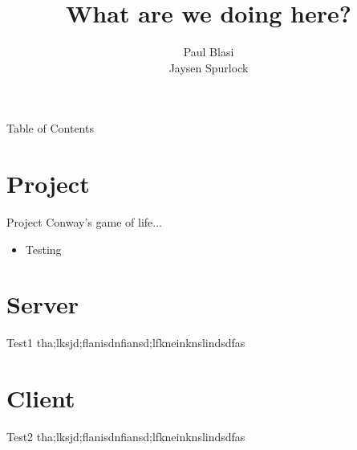 \documentclass[11pt]{beamer}
\author[]{Paul Blasi \\ Jaysen Spurlock}
\title[]{What are we doing here?}
\begin{document}
\begin{frame}
\titlepage
\end{frame}

\begin{frame}{Table of Contents}
\tableofcontents
\end{frame}

\section{Project}
\begin{frame}{Project}
Conway's game of life...

\begin{itemize}
\item<4-> Testing
\end{itemize}
\end{frame}

\section{Server}
\begin{frame}{Test1}
tha;lksjd;flanisdnfiansd;lfkneinknslindsdfas
\end{frame}

\section{Client}
\begin{frame}{Test2}
tha;lksjd;flanisdnfiansd;lfkneinknslindsdfas
\end{frame}
\end{document}
